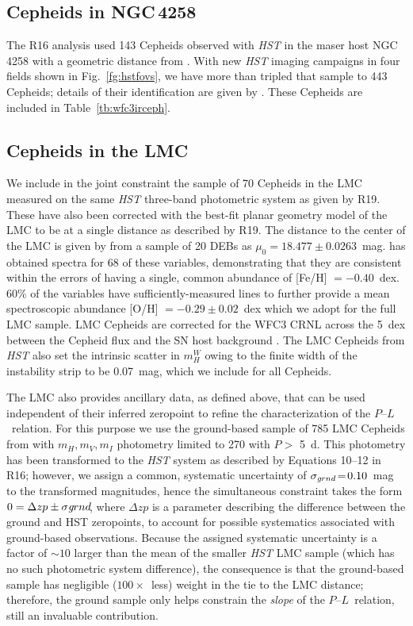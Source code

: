 \documentclass[12pt]{aastex631}
\newcommand{\PLs}{$P$--$L$\ }
\begin{document}
\subsection{Cepheids in NGC$\,$4258\label{sc:4.4}}

The R16 analysis used 143 Cepheids observed with  {\it HST} in the maser host NGC$\,$4258 with a geometric distance from \cite{Reid:2019}.  With new {\it HST} imaging campaigns in four fields shown in Fig.~\ref{fg:hstfovs}, we have more than tripled that sample to 443 Cepheids; details of their identification are given by \citet{Yuan:2021_N4258}. These Cepheids are included in Table~\ref{tb:wfc3irceph}.

       
\subsection{Cepheids in the LMC\label{sc:4.2}}
       
We include in the joint constraint the sample of 70 Cepheids in the LMC measured on the same {\it HST}  three-band photometric system as given by R19. These have also been corrected with the best-fit planar geometry model of the LMC to be at a single distance as described by R19.  The distance to the center of the LMC is given by \cite{Pietrzynski:2019} from a sample of 20 DEBs as $\mu_0=18.477\pm0.0263$~mag. \citet{Romaniello:2021} has obtained spectra for 68 of these variables, demonstrating that they are consistent within the errors of having a single, common abundance of [Fe/H] $=-0.40$~dex. 60\% of the variables have sufficiently-measured lines to further provide a mean spectroscopic abundance [O/H] $=-0.29 \pm 0.02$~dex which we adopt for the full LMC sample.   LMC Cepheids are corrected for the WFC3 CRNL across the 5~dex between the Cepheid flux and the SN host background \citep{Riess:2019b}.  The LMC Cepheids from {\it HST} also set the intrinsic scatter in $m^W_H$ owing to the finite width of the instability strip to be 0.07~mag, which we include for all Cepheids.
       
The LMC also provides ancillary data, as defined above, that can be used independent of their inferred zeropoint to refine the characterization of the \PLs relation. For this purpose we use the ground-based sample of 785 LMC Cepheids from \citet{Macri:2015} with {\it $m_H,m_V,m_I$} photometry limited to 270 with $P>$ 5~d.  This photometry has been transformed to the {\it HST} system as described by Equations 10--12 in R16; however, we assign a common, systematic uncertainty of $\sigma_{\textit grnd}\!=\!0.10$~mag to the transformed magnitudes, hence the simultaneous constraint takes the form 
$0=\Delta zp \pm \sigma{\textit grnd}\!$, where $\Delta zp$ is a parameter describing the difference between the ground and HST zeropoints, to account for possible systematics associated with ground-based observations.   Because the assigned systematic uncertainty is a factor of $\sim 10$ larger than the mean of the smaller {\it HST} LMC sample (which has no such photometric system difference), the consequence is that the ground-based sample has negligible ($100\times$~less) weight in the tie to the LMC distance; therefore, the ground sample only helps constrain the {\it slope} of the \PLs relation, still an invaluable contribution.
           
\end{document}
